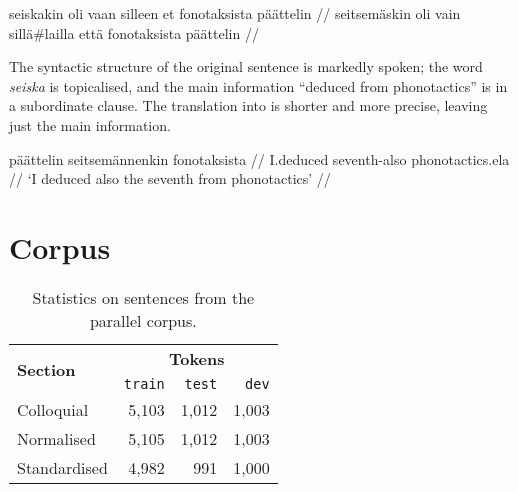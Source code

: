 \documentclass[11pt]{article}
\begin{document}
\ex
\begingl
\gla seiskakin oli vaan silleen et fonotaksista p\"{a}\"{a}ttelin //
\glb seitsem\"{a}skin oli vain sill\"{a}\#lailla ett\"{a} fonotaksista p\"{a}\"{a}ttelin //
\endgl
\xe

 The syntactic structure of the original sentence is markedly spoken; the word \emph{seiska} is topicalised, and the main information ``deduced from phonotactics'' is in a subordinate clause. 
The translation into  is shorter and more precise, leaving just the main information.

\ex
\begingl
\gla p\"{a}\"{a}ttelin seitsem\"{a}nnenkin fonotaksista //
\glb I.deduced seventh-{\sc also} phonotactics.{\sc ela} //
\glft `I deduced also the seventh from phonotactics' //
\endgl
\xe






\section{Corpus}

\begin{table}
  \centering
 \begin{tabular}{|l|r|r|r|}
    \hline
    \multirow{2}{*}{\textbf{Section}} & \multicolumn{3}{|c|}{\textbf{Tokens}} \\\cline{2-4}
                                      & \texttt{train} & \texttt{test} & \texttt{dev} \\
    \hline
    Colloquial                           & 5,103 & 1,012 & 1,003 \\ 
    Normalised                           & 5,105 & 1,012 & 1,003 \\ 
    Standardised                         & 4,982 & 991 & 1,000 \\
    \hline
 \end{tabular} 
  \caption{Statistics on sentences from the parallel corpus.}
  \label{table:corpsize}
\end{table}
\end{document}
